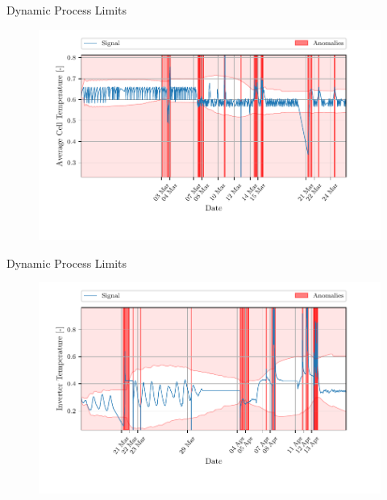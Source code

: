 \documentclass[aspectratio=169]{beamer}
\begin{document}
\begin{frame}{Dynamic Process Limits}
    \begin{figure}[htpb]
        \begin{center}
            \includegraphics[width=0.78\linewidth]{figures/Average_Cell_Temperature_sliding_thresh_.pdf}
        \end{center}
    \end{figure}
\end{frame}

\begin{frame}{Dynamic Process Limits}
    \begin{figure}[htpb]
        \begin{center}
            \includegraphics[width=0.78\linewidth]{figures/Inverter_Temperature_sliding_thresh.pdf}
        \end{center}
    \end{figure}
\end{frame}
\end{document}

